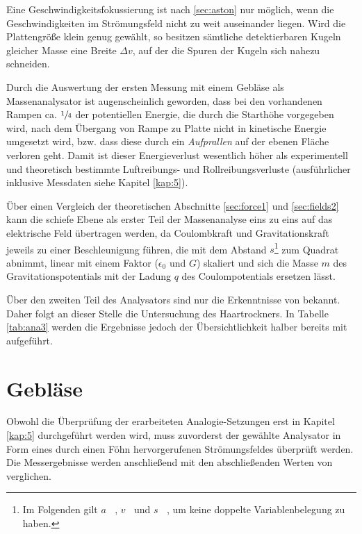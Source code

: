 Eine Geschwindigkeitsfokussierung ist nach \ref{sec:aston} nur möglich, wenn die Geschwindigkeiten im Strömungsfeld nicht zu weit auseinander liegen. Wird die Plattengröße klein genug gewählt, so besitzen sämtliche detektierbaren Kugeln gleicher Masse eine Breite $\Delta v$, auf der die Spuren der Kugeln sich nahezu schneiden.

Durch die Auswertung der ersten Messung mit einem Gebläse als Massenanalysator ist augenscheinlich geworden, dass bei den vorhandenen Rampen ca. $\sfrac{1}{4}$ der potentiellen Energie, die durch die Starthöhe vorgegeben wird, nach dem Übergang von Rampe zu Platte nicht in kinetische Energie umgesetzt wird, bzw. dass diese durch ein \textit{Aufprallen} auf der ebenen Fläche verloren geht. Damit ist dieser Energieverlust wesentlich höher als experimentell und theoretisch bestimmte Luftreibungs- und Rollreibungsverluste (ausführlicher inklusive Messdaten siehe Kapitel \ref{kap:5}).

Über einen Vergleich der theoretischen Abschnitte \ref{sec:force1} und \ref{sec:fields2} kann die schiefe Ebene als erster Teil der Massenanalyse eins zu eins auf das elektrische Feld übertragen werden, da Coulombkraft und Gravitationskraft jeweils zu einer Beschleunigung führen, die mit dem Abstand $s$\footnote{Im Folgenden gilt $a \mathop{\hat{=}} $ , $v \mathop{\hat{=}} $  und $s \mathop{\hat{=}} $ , um keine doppelte Variablenbelegung zu haben.} zum Quadrat abnimmt, linear mit einem Faktor ($\epsilon_0$ und $G$) skaliert und sich die Masse $m$ des Gravitationspotentials mit der Ladung $q$ des Coulompotentials ersetzen lässt.

Über den zweiten Teil des Analysators sind nur die Erkenntnisse von \textcite{Schilling1987} bekannt. Daher folgt an dieser Stelle die Untersuchung des Haartrockners. In Tabelle \ref{tab:ana3} werden die Ergebnisse jedoch der Übersichtlichkeit halber bereits mit aufgeführt.



\section{Gebläse}
\label{sec:analysatoren1}

Obwohl die Überprüfung der erarbeiteten Analogie-Setzungen erst in Kapitel \ref{kap:5} durchgeführt werden wird, muss zuvorderst der gewählte Analysator in Form eines durch einen Föhn hervorgerufenen Strömungsfeldes überprüft werden. Die Messergebnisse werden anschließend mit den abschließenden Werten von \textcite[S.\,53--66]{Mais2014} verglichen.

